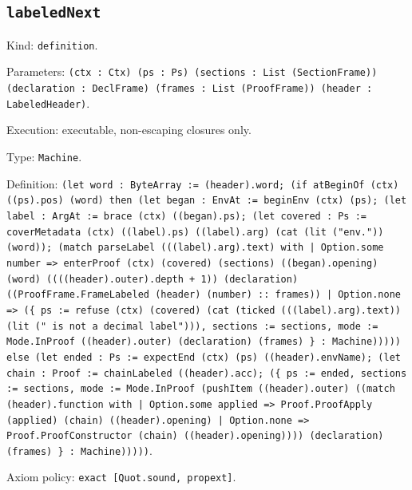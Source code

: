 \documentclass[11pt]{article}
\begin{document}
\subsection*{\texttt{labeledNext}}
\noindent Kind: \texttt{definition}.\par
\noindent Parameters: \texttt{(ctx : Ctx) (ps : Ps) (sections : List (SectionFrame)) (declaration : DeclFrame) (frames : List (ProofFrame)) (header : LabeledHeader)}.\par
\noindent Execution: executable, non-escaping closures only.\par
\noindent Type: \texttt{Machine}.\par
\noindent Definition: \texttt{(let word : ByteArray := (header).word; (if atBeginOf (ctx) ((ps).pos) (word) then (let began : EnvAt := beginEnv (ctx) (ps); (let label : ArgAt := brace (ctx) ((began).ps); (let covered : Ps := coverMetadata (ctx) ((label).ps) ((label).arg) (cat (lit ("env.")) (word)); (match parseLabel (((label).arg).text) with | Option.some number => enterProof (ctx) (covered) (sections) ((began).opening) (word) ((((header).outer).depth + 1)) (declaration) ((ProofFrame.FrameLabeled (header) (number) :: frames)) | Option.none => (\{ ps := refuse (ctx) (covered) (cat (ticked (((label).arg).text)) (lit (" is not a decimal label"))), sections := sections, mode := Mode.InProof ((header).outer) (declaration) (frames) \} : Machine))))) else (let ended : Ps := expectEnd (ctx) (ps) ((header).envName); (let chain : Proof := chainLabeled ((header).acc); (\{ ps := ended, sections := sections, mode := Mode.InProof (pushItem ((header).outer) ((match (header).function with | Option.some applied => Proof.ProofApply (applied) (chain) ((header).opening) | Option.none => Proof.ProofConstructor (chain) ((header).opening)))) (declaration) (frames) \} : Machine)))))}.\par
\noindent Axiom policy: \texttt{exact [Quot.sound, propext]}.\par
\end{document}

